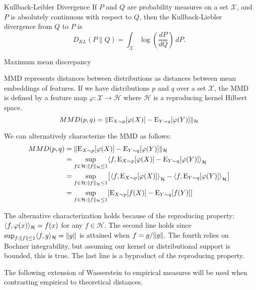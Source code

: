 \begin{definition}{Kullback-Leibler Divergence}
	If $P$ and $Q$ are probability measures on a set $\mathcal{X}$, and $P$ is absolutely continuous with respect to $Q$, then the Kullback-Liebler divergence from $Q$ to $P$ is
	\[
	D_{KL}(P \parallel Q)=\int_{\mathcal{X}} \log \left( \frac{dP}{dQ}\right) \, dP.
	\]
\end{definition}

\begin{definition}{Maximum mean discrepancy}
	
	MMD represents distances between distributions as distances between mean embeddings of features. If we have distributions $p$ and $q$ over a set $\mathcal{X}$, the MMD is defined by a feature map $\varphi: \mathcal{X}\to \mathcal{H}$ where $\mathcal{H}$ is a reproducing kernel Hilbert space.
	\[
	MMD(p,q) = \lVert \mathrm{E}_{X\sim p}[\varphi(X)] - \mathrm{E}_{Y\sim q}[\varphi(Y)] \rVert_{\mathcal{H}}
	\]
	
	We can alternatively characterize the MMD as follows:
	\begin{align*}
	MMD(p,q) &= \norm{ \E_{X\sim p}[\varphi(X)] - \E_{Y\sim q}[\varphi(Y)] }_{\mathcal{H}} \\
	&= \sup_{f\in \mathcal{H}:\norm{f}_{\mathcal{H}}\leq 1} \ang*{f,\E_{X\sim p}[\varphi(X)] - \E_{Y\sim q}[\varphi(Y)]}_{\mathcal{H}} \\
	&= \sup_{f\in \mathcal{H}:\norm{f}_{\mathcal{H}}\leq 1} \bkt*{\ang*{f,\E_{X\sim p}[\varphi(X)]}_{\mathcal{H}} - \ang*{f,\E_{Y\sim q}[\varphi(Y)]}_{\mathcal{H}} } \\
	&= \sup_{f\in \mathcal{H}:\norm{f}_{\mathcal{H}}\leq 1} \bkt*{ \E_{X\sim p}[f(X)] - \E_{Y\sim q}[f(Y)] }
	\end{align*}
\end{definition}

The alternative characterization holds because of the reproducing property: 
$\langle f,\varphi(x)\rangle_{\mathcal{H}}=f(x)$ for any
$f\in \mathcal{H}$. The second line holds since $\sup_{f:\lVert f\rVert\leq 1} \langle f,g\rangle_{\mathcal{H}} = \lVert g\rVert$ is attained when $f=g/\lVert g\rVert$. The fourth relies on Bochner integrability, but assuming our kernel or distributional support is bounded, this is true. The last line is a byproduct of the reproducing property.

The following extension of Wasserstein to empirical measures will be used when contrasting empirical to theoretical distances.

